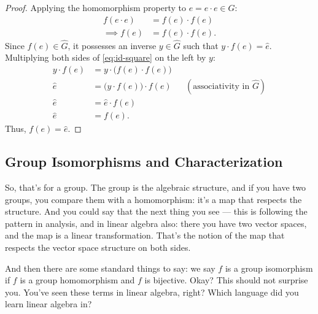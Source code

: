 \begin{content}

\begin{proof}
Applying the homomorphism property to $e = e \cdot e \in G$:
\begin{align}
f(e \cdot e) &= f(e) \cdot f(e) \nonumber \\
\implies f(e) &= f(e) \cdot f(e). \label{eq:id-square}
\end{align}
Since $f(e) \in \hat{G}$, it possesses an inverse $y \in \hat{G}$ such that $y \cdot f(e) = \hat{e}$. Multiplying both sides of \eqref{eq:id-square} on the left by $y$:
\begin{align*}
y \cdot f(e) &= y \cdot \bigl(f(e) \cdot f(e)\bigr) \\
\hat{e} &= \bigl(y \cdot f(e)\bigr) \cdot f(e) && (\text{associativity in } \hat{G}) \\
\hat{e} &= \hat{e} \cdot f(e) \\
\hat{e} &= f(e).
\end{align*}
Thus, $f(e) = \hat{e}$.
\end{proof}
\end{content}

\subsection{Group Isomorphisms and Characterization}

\begin{speech}[00:10:40 - 00:11:45]
So, that's for a group. The group is the algebraic structure, and if you have two groups, you compare them with a homomorphism: it's a map that respects the structure. And you could say that the next thing you see --- this is following the pattern in analysis, and in linear algebra also: there you have two vector spaces, and the map is a linear transformation. That's the notion of the map that respects the vector space structure on both sides.

And then there are some standard things to say: we say $f$ is a group isomorphism  if $f$ is a group homomorphism  and $f$ is bijective.  Okay? This should not surprise you. You've seen these terms in linear algebra, right? Which language did you learn linear algebra in?
\end{speech}

